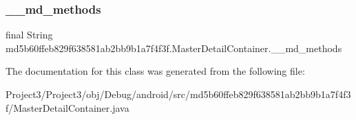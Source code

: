 \subsubsection{\texorpdfstring{\+\_\+\+\_\+md\+\_\+methods}{\_\_md\_methods}}
{\footnotesize\ttfamily final String md5b60ffeb829f638581ab2bb9b1a7f4f3f.\+Master\+Detail\+Container.\+\_\+\+\_\+md\+\_\+methods\hspace{0.3cm}{\ttfamily [static]}}



The documentation for this class was generated from the following file\+:\begin{DoxyCompactItemize}
\item 
Project3/\+Project3/obj/\+Debug/android/src/md5b60ffeb829f638581ab2bb9b1a7f4f3f/Master\+Detail\+Container.\+java\end{DoxyCompactItemize}

